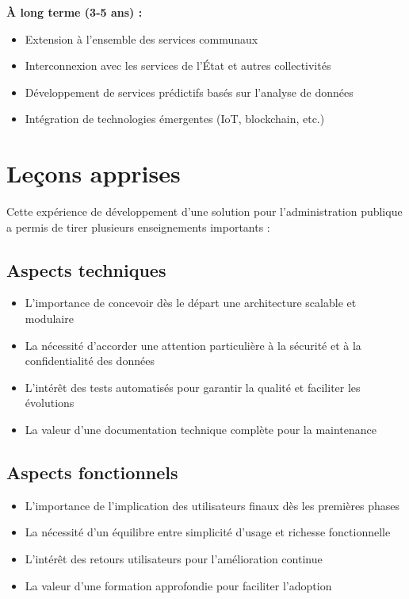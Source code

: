 \textbf{À long terme (3-5 ans) :}
\begin{itemize}
    \item Extension à l'ensemble des services communaux
    \item Interconnexion avec les services de l'État et autres collectivités
    \item Développement de services prédictifs basés sur l'analyse de données
    \item Intégration de technologies émergentes (IoT, blockchain, etc.)
\end{itemize}

\section*{Leçons apprises}

Cette expérience de développement d'une solution pour l'administration publique a permis de tirer plusieurs enseignements importants :

\subsection*{Aspects techniques}

\begin{itemize}
    \item L'importance de concevoir dès le départ une architecture scalable et modulaire
    \item La nécessité d'accorder une attention particulière à la sécurité et à la confidentialité des données
    \item L'intérêt des tests automatisés pour garantir la qualité et faciliter les évolutions
    \item La valeur d'une documentation technique complète pour la maintenance
\end{itemize}

\subsection*{Aspects fonctionnels}

\begin{itemize}
    \item L'importance de l'implication des utilisateurs finaux dès les premières phases
    \item La nécessité d'un équilibre entre simplicité d'usage et richesse fonctionnelle
    \item L'intérêt des retours utilisateurs pour l'amélioration continue
    \item La valeur d'une formation approfondie pour faciliter l'adoption
\end{itemize}

